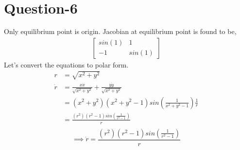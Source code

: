 \documentclass{article}
\begin{document}
\section*{Question-6}
Only equilibrium point is origin. Jacobian at equilibrium point is found to be,
\begin{align*}
    \begin{bmatrix} sin(1)  & 1 \\ -1 & sin(1)\end{bmatrix}
\end{align*}
Let's convert the equations to polar form.
\begin{align*}
    r &= \sqrt{x^2 + y^2} \\
    \dot{r} &= \frac{x\dot{x}}{\sqrt{x^2 + y^2}} + \frac{y\dot{y}}{\sqrt{x^2 + y^2}} \\
    &= (x^2 + y^2)(x^2 + y^2 - 1)sin(\frac{1}{x^2+y^2-1})\frac{1}{r} \\
    &= \frac{(r^2)(r^2-1)sin(\frac{1}{r^2-1})}{r} \\
\end{align*}
\begin{equation}
    \implies \dot{r} = \frac{(r^2)(r^2-1)sin(\frac{1}{r^2-1})}{r}
\end{equation}
\end{document}
